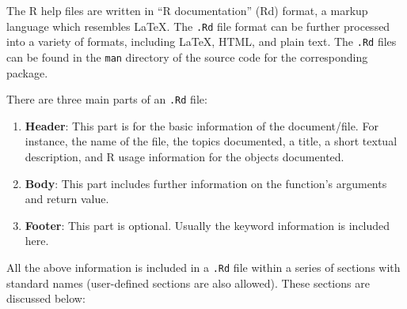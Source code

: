 \documentclass[
]{book}
\begin{document}
The R help files are written in ``R documentation'' (Rd) format, a markup language which resembles LaTeX. The \texttt{.Rd} file format can be further processed into a variety of formats, including LaTeX, HTML, and plain text. The \texttt{.Rd} files can be found in the \texttt{man} directory of the source code for the corresponding package.

There are three main parts of an \texttt{.Rd} file:

\begin{enumerate}
\def\labelenumi{\arabic{enumi}.}
\item
  \textbf{Header}: This part is for the basic information of the document/file. For instance, the name of the file, the topics documented, a title, a short textual description, and R usage information for the objects documented.
\item
  \textbf{Body}: This part includes further information on the function's arguments and return value.
\item
  \textbf{Footer}: This part is optional. Usually the keyword information is included here.
\end{enumerate}

All the above information is included in a \texttt{.Rd} file within a series of sections with standard names (user-defined sections are also allowed). These sections are discussed below:
\end{document}
